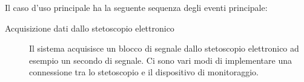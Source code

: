 Il caso d'uso principale ha la seguente sequenza degli eventi principale:
\begin{description}
  \item[Acquisizione dati dallo stetoscopio elettronico]
    Il sistema acquisisce un blocco di segnale dallo stetoscopio elettronico ad esempio un secondo di segnale.
% 
% 
% 
Ci sono vari modi di implementare una connessione tra lo stetoscopio e il dispositivo di monitoraggio. 
% 
% 

\end{description}
